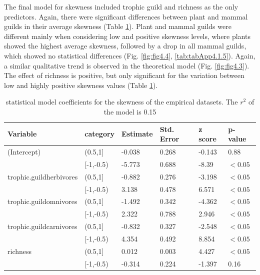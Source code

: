 The final model for skewness included trophic guild and richness as the only predictors. Again, there were significant differences between plant and mammal guilds in their average skewness (Table \ref{tab:tab4.4}). Plant and mammal guilds were different mainly when considering low and positive skewness levels, where plants showed the highest average skewness, followed by a drop in all mammal guilds, which showed no statistical differences (Fig. \ref{fig:fig4.4}, \cref{tab:tabApp4.1.5}). Again, a similar qualitative trend is observed in the theoretical model (Fig. \ref{fig:fig4.3}). The effect of richness is positive, but only significant for the variation between low and highly positive skewness values (Table \ref{tab:tab4.4}).

\begin{table}[htbp!]
\centering
\caption[Skewness model coefficients]{\color{Gray} statistical model coefficients for the skewness of the empirical datasets. The $r^2$ of the model is 0.15}\label{tab:tab4.4}
\begin{tabular}{llllll}
\hline
Variable & category & Estimate & Std. Error & z score & p-value \\
\hline
(Intercept)              & (0.5,1] & -0.038 & 0.268 & -0.143  & 0.88 \\
                         & [-1,-0.5) & -5.773  & 0.688 & -8.39 & $<0.05$ \\
trophic.guildherbivores   & (0.5,1] & -0.882 & 0.276 & -3.198 & $<0.05$ \\
                         & [-1,-0.5) & 3.138 & 0.478 & 6.571 & $<0.05$ \\
trophic.guildomnivores    & (0.5,1] & -1.492  & 0.342 & -4.362 & $<0.05$ \\
                         & [-1,-0.5) &  2.322 & 0.788 & 2.946  & $<0.05$ \\
trophic.guildcarnivores    & (0.5,1] & -0.832 & 0.327 & -2.548 & $<0.05$ \\
                         & [-1,-0.5) & 4.354 & 0.492 & 8.854 & $<0.05$ \\
richness                 & (0.5,1] & 0.012 & 0.003 & 4.427   & $<0.05$ \\
                         & [-1,-0.5) & -0.314 & 0.224  & -1.397 & 0.16 \\
\hline
\end{tabular}

\end{table}

\FloatBarrier


